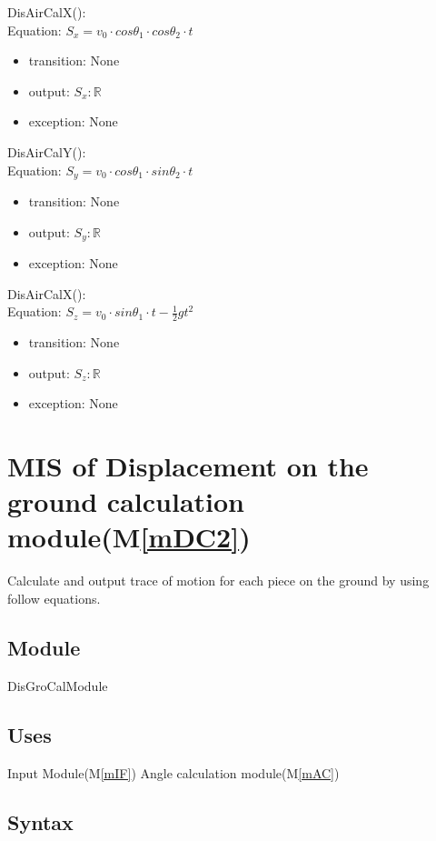 \documentclass[12pt, titlepage]{article}
\newcommand{\mref}[1]{M\ref{#1}}
\begin{document}
\noindent DisAirCalX():\\
Equation: $S_{x}=v_{0}\cdot cos\theta _{1}\cdot cos\theta _{2}\cdot t$
\begin{itemize}
	\item transition: None
	\item output: $S_{x}: \mathbb{R}$ 
	\item exception: None
\end{itemize}

\noindent DisAirCalY():\\
Equation: $S_{y}=v_{0}\cdot cos\theta _{1}\cdot sin\theta _{2}\cdot t$
\begin{itemize}
	\item transition: None
	\item output: $S_{y}: \mathbb{R}$ 
	\item exception: None
\end{itemize}

\noindent DisAirCalX():\\
Equation: $S_{z}=v_{0}\cdot sin\theta _{1}\cdot t-\frac{1}{2}gt^{2}$
\begin{itemize}
	\item transition: None
	\item output: $S_{z}: \mathbb{R}$ 
	\item exception: None
\end{itemize}

\section{MIS of Displacement on the ground calculation module(\mref{mDC2})}
Calculate and output trace of motion for each piece on the ground by using follow equations.
\subsection{Module}

DisGroCalModule

\subsection{Uses}

Input Module(\mref{mIF})
Angle calculation module(\mref{mAC})

\subsection{Syntax}
\end{document}
